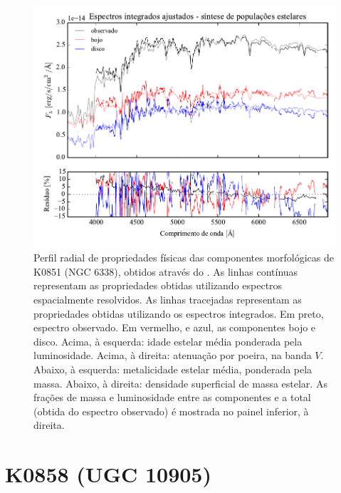 \begin{figure}
	\includegraphics[page=14]{figuras/sample006a_synthesis}
	\caption[Propriedades físicas das componentes morfológicas de K0851 (NGC 6338)]
	{Perfil radial de propriedades físicas das componentes morfológicas de
	K0851 (NGC 6338), obtidos através do \starlight. As linhas contínuas
	representam as propriedades obtidas utilizando espectros espacialmente
	resolvidos. As linhas tracejadas representam as propriedades obtidas utilizando
	os espectros integrados. Em preto, espectro observado. Em vermelho, e azul, as
	componentes bojo e disco. Acima, à esquerda: idade estelar média ponderada pela
	luminosidade. Acima, à direita: atenuação por poeira, na banda $V$. Abaixo, à
	esquerda: metalicidade estelar média, ponderada pela massa. Abaixo, à direita:
	densidade superficial de massa estelar. As frações de massa e luminosidade
	entre as componentes e a total (obtida do espectro observado) é mostrada no
	painel inferior, à direita.}
	\label{fig:decompSinteseRadprof:K0851}
\end{figure}


\section{K0858 (UGC 10905)}
\label{apendice:Decomp:K00858}

